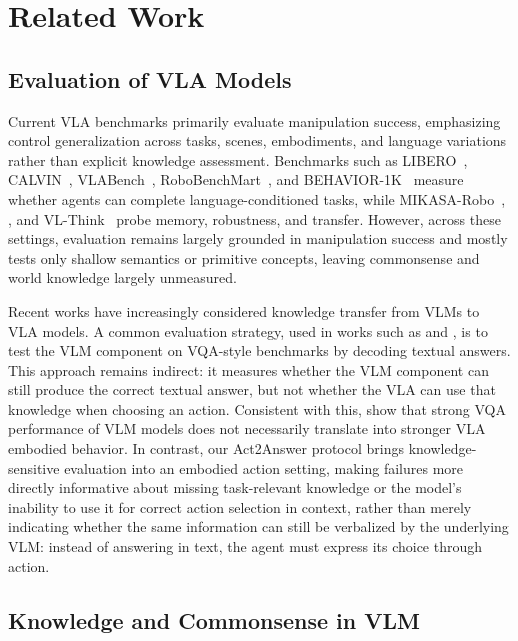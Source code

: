 \documentclass[11pt]{article}
\begin{document}
\section{Related Work}

\subsection{Evaluation of VLA Models}

Current VLA benchmarks primarily evaluate manipulation success, emphasizing control generalization across tasks, scenes, embodiments, and language variations rather than explicit knowledge assessment. Benchmarks such as LIBERO~\citep{libero}, CALVIN~\citep{calvin}, VLABench~\citep{vlabench}, RoboBenchMart~\citep{soshin2025robobenchmart}, and BEHAVIOR-1K~\citep{behavior1k} measure whether agents can complete language-conditioned tasks, while MIKASA-Robo~\citep{mikasa}, \citep{bringapplesofaimpact}, and VL-Think~\citep{blindvla} probe memory, robustness, and transfer. However, across these settings, evaluation remains largely grounded in manipulation success and mostly tests only shallow semantics or primitive concepts, leaving commonsense and world knowledge largely unmeasured.

Recent works have increasingly considered knowledge transfer from VLMs to VLA models. A common evaluation strategy, used in works such as \citep{cai2026xiaomi} and \citep{chen2025internvla}, is to test the VLM component on VQA-style benchmarks by decoding textual answers. This approach remains indirect: it measures whether the VLM component can still produce the correct textual answer, but not whether the VLA can use that knowledge when choosing an action. Consistent with this, \citet{zhang2026vlm4vla} show that strong VQA performance of VLM models does not necessarily translate into stronger VLA embodied behavior. In contrast, our Act2Answer protocol brings knowledge-sensitive evaluation into an embodied action setting, making failures more directly informative about missing task-relevant knowledge or the model’s inability to use it for correct action selection in context, rather than merely indicating whether the same information can still be verbalized by the underlying VLM: instead of answering in text, the agent must express its choice through action.

\subsection{Knowledge and Commonsense in VLM}
\end{document}
